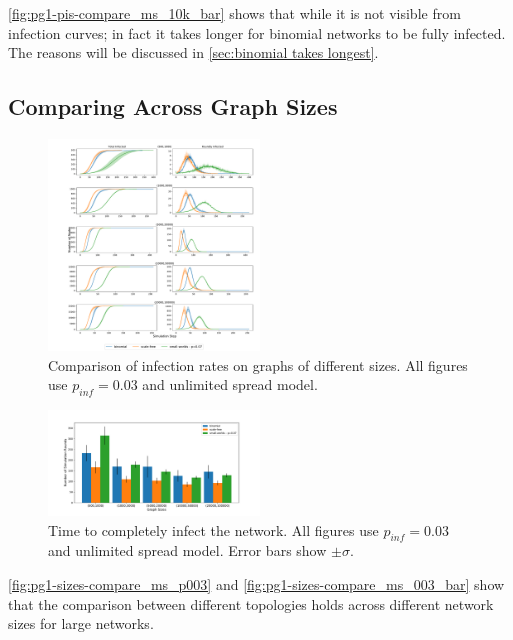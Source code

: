 \documentclass[conference]{IEEEtran}
\begin{document}
\autoref{fig:pg1-pis-compare_ms_10k_bar} shows that while it is not visible from infection curves; in fact it takes longer for binomial networks to be fully infected. The reasons will be discussed in \autoref{sec:binomial takes longest}.

\subsection{Comparing Across Graph Sizes}


\begin{figure}[htb]
  \begin{center}
	\includegraphics[width=0.5\textwidth]{img/pg1-sizes-compare_ms_p003.pdf}
  \end{center}
	\caption{Comparison of infection rates on graphs of different sizes. All figures use $p_{inf} = 0.03$ and unlimited spread model.}
	\label{fig:pg1-sizes-compare_ms_p003}
\end{figure}

\begin{figure}[htb]
  \begin{center}
	\includegraphics[width=0.5\textwidth]{img/pg1-sizes-compare_ms_003_bar.pdf}
  \end{center}
	\caption{Time to completely infect the network. All figures use $p_{inf} = 0.03$ and unlimited spread model. Error bars show $\pm \sigma$.}
	\label{fig:pg1-sizes-compare_ms_003_bar}
\end{figure}

\autoref{fig:pg1-sizes-compare_ms_p003} and \autoref{fig:pg1-sizes-compare_ms_003_bar} show that the comparison between different topologies holds across different network sizes for large networks.
\end{document}

